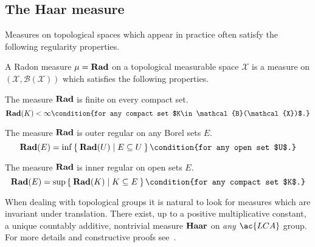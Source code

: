 \subsection{The Haar measure}
Measures on topological spaces which appear in practice often satisfy the following regularity properties.
\begin{definition}
A Radon measure $\mu=\mathbf{Rad}$ on a topological measurable space $\mathcal{X}$ is a measure on
$(\mathcal{X}, \mathcal{B}(\mathcal{X}))$ which satisfies the following properties.
\begin{propenum}
\item The measure $\mathbf{Rad}$ is finite on every compact set.
\begin{dmath*}
\Radon(K) < \infty\condition{for any compact set $K\in\mathcal{B}(\mathcal{X})$.}
\end{dmath*}
\item The measure $\mathbf{Rad}$ is outer regular on any Borel sets $E$.
\begin{dmath*}
\Radon(E)=\inf \Set{\Radon(U) | E\subseteq U}\condition{for any open set $U$.}
\end{dmath*}
\item The measure $\mathbf{Rad}$ is inner regular on open sets $E$.
\begin{dmath*}
\Radon(E)=\sup\Set{\Radon(K) | K\subseteq E}\condition{for any compact set $K$.}
\end{dmath*}
\end{propenum}
\end{definition}

When dealing with topological groups it is natural to look for measures which
are invariant under translation. There exist, up to a positive multiplicative constant, a unique countably additive, nontrivial measure $\mathbf{Haar}$ on \emph{any} $\ac{LCA}$ group. For more details and constructive proofs see~\citet{alfsen1964simplified,folland1994course,conway2013course}.

